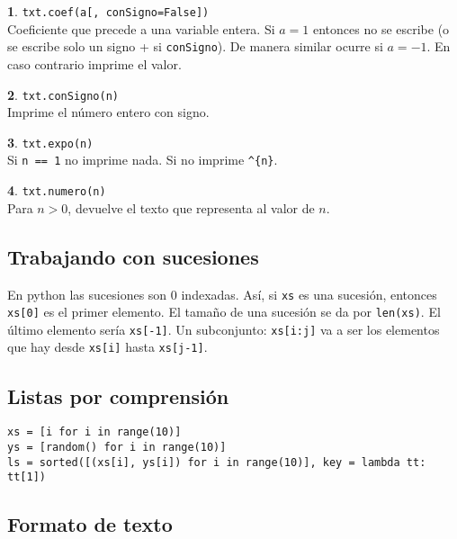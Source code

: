 \documentclass[12pt]{article}
\theoremstyle{definition}
\newtheorem{funcion}{}[section]
\begin{document}
\begin{funcion}
  \verb|txt.coef(a[, conSigno=False])| \\[1ex]
  Coeficiente que precede a una variable entera. Si $a=1$ entonces no se escribe (o se escribe solo un signo + si \verb|conSigno|). De manera similar ocurre si $a=-1$. En caso contrario imprime el valor.
\end{funcion}

\begin{funcion}
  \verb|txt.conSigno(n)| \\[1ex]
  Imprime el n\'umero entero con signo.
\end{funcion}

\begin{funcion}
  \verb|txt.expo(n)| \\[1ex]
  Si \verb|n == 1| no imprime nada. Si no imprime \verb|^{n}|.
\end{funcion}

\begin{funcion}
  \verb|txt.numero(n)| \\[1ex]
  Para $n > 0$, devuelve el texto que representa al valor de $n$.
\end{funcion}

\subsection{Trabajando con sucesiones}

En python las sucesiones son 0 indexadas. As\'i, si \verb|xs| es una sucesi\'on, entonces \verb|xs[0]| es el primer elemento. El tama\~no de una sucesi\'on se da por \verb|len(xs)|. El \'ultimo elemento ser\'ia \verb|xs[-1]|. Un subconjunto: \verb|xs[i:j]| va a ser los elementos que hay desde \verb|xs[i]| hasta \verb|xs[j-1]|.

\subsection{Listas por comprensi\'on}
\begin{verbatim}
xs = [i for i in range(10)]
ys = [random() for i in range(10)]
ls = sorted([(xs[i], ys[i]) for i in range(10)], key = lambda tt: tt[1])
\end{verbatim}

\subsection{Formato de texto}
\end{document}

